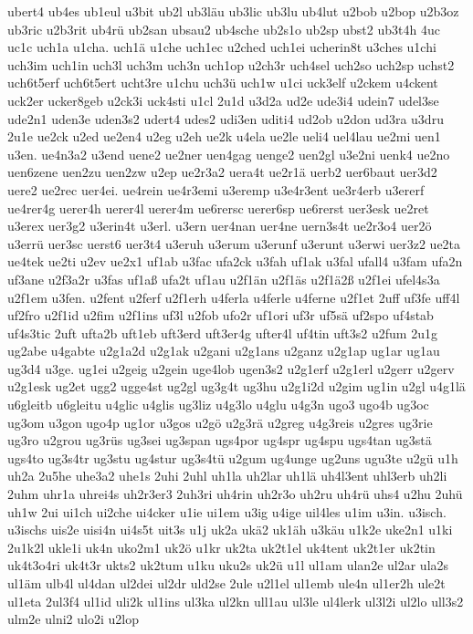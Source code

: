 {ubert4
ub4es
ub1eul
u3bit
ub2l
ub3läu
ub3lic
ub3lu
ub4lut
u2bob
u2bop
u2b3oz
ub3ric
u2b3rit
ub4rü
ub2san
ubsau2
ub4sche
ub2s1o
ub2sp
ubst2
ub3t4h
4uc
uc1c
uch1a
u1cha.
uch1ä
u1che
uch1ec
u2ched
uch1ei
ucherin8t
u3ches
u1chi
uch3im
uch1in
uch3l
uch3m
uch3n
uch1op
u2ch3r
uch4sel
uch2so
uch2sp
uchst2
uch6t5erf
uch6t5ert
ucht3re
u1chu
uch3ü
uch1w
u1ci
uck3elf
u2ckem
u4ckent
uck2er
ucker8geb
u2ck3i
uck4sti
u1cl
2u1d
u3d2a
ud2e
ude3i4
udein7
udel3se
ude2n1
uden3e
uden3s2
udert4
udes2
udi3en
uditi4
ud2ob
u2don
ud3ra
u3dru
2u1e
ue2ck
u2ed
ue2en4
u2eg
u2eh
ue2k
u4ela
ue2le
ueli4
uel4lau
ue2mi
uen1
u3en.
ue4n3a2
u3end
uene2
ue2ner
uen4gag
uenge2
uen2gl
u3e2ni
uenk4
ue2no
uen6zene
uen2zu
uen2zw
u2ep
ue2r3a2
uera4t
ue2r1ä
uerb2
uer6baut
uer3d2
uere2
ue2rec
uer4ei.
ue4rein
ue4r3emi
u3eremp
u3e4r3ent
ue3r4erb
u3ererf
ue4rer4g
uerer4h
uerer4l
uerer4m
ue6rersc
uerer6sp
ue6rerst
uer3esk
ue2ret
u3erex
uer3g2
u3erin4t
u3erl.
u3ern
uer4nan
uer4ne
uern3s4t
ue2r3o4
uer2ö
u3errü
uer3sc
uerst6
uer3t4
u3eruh
u3erum
u3erunf
u3erunt
u3erwi
uer3z2
ue2ta
ue4tek
ue2ti
u2ev
ue2x1
uf1ab
u3fac
ufa2ck
u3fah
uf1ak
u3fal
ufall4
u3fam
ufa2n
uf3ane
u2f3a2r
u3fas
uf1aß
ufa2t
uf1au
u2f1än
u2f1äs
u2f1ä2ß
u2f1ei
ufel4s3a
u2f1em
u3fen.
u2fent
u2ferf
u2f1erh
u4ferla
u4ferle
u4ferne
u2f1et
2uff
uf3fe
uff4l
uf2fro
u2f1id
u2fim
u2f1ins
uf3l
u2fob
ufo2r
uf1ori
uf3r
uf5sä
uf2spo
uf4stab
uf4s3tic
2uft
ufta2b
uft1eb
uft3erd
uft3er4g
ufter4l
uf4tin
uft3s2
u2fum
2u1g
ug2abe
u4gabte
u2g1a2d
u2g1ak
u2gani
u2g1ans
u2ganz
u2g1ap
ug1ar
ug1au
ug3d4
u3ge.
ug1ei
u2geig
u2gein
uge4lob
ugen3s2
u2g1erf
u2g1erl
u2gerr
u2gerv
u2g1esk
ug2et
ugg2
ugge4st
ug2gl
ug3g4t
ug3hu
u2g1i2d
u2gim
ug1in
u2gl
u4g1lä
u6gleitb
u6gleitu
u4glic
u4glis
ug3liz
u4g3lo
u4glu
u4g3n
ugo3
ugo4b
ug3oc
ug3om
u3gon
ugo4p
ug1or
u3gos
u2gö
u2g3rä
u2greg
u4g3reis
u2gres
ug3rie
ug3ro
u2grou
ug3rüs
ug3sei
ug3span
ugs4por
ug4spr
ug4spu
ugs4tan
ug3stä
ugs4to
ug3s4tr
ug3stu
ug4stur
ug3s4tü
u2gum
ug4unge
ug2uns
ugu3te
u2gü
u1h
uh2a
2u5he
uhe3a2
uhe1s
2uhi
2uhl
uh1la
uh2lar
uh1lä
uh4l3ent
uhl3erb
uh2li
2uhm
uhr1a
uhrei4s
uh2r3er3
2uh3ri
uh4rin
uh2r3o
uh2ru
uh4rü
uhs4
u2hu
2uhü
uh1w
2ui
ui1ch
ui2che
ui4cker
u1ie
ui1em
u3ig
u4ige
uil4les
u1im
u3in.
u3isch.
u3ischs
uis2e
uisi4n
ui4s5t
uit3s
u1j
uk2a
ukä2
uk1äh
u3käu
u1k2e
uke2n1
u1ki
2u1k2l
ukle1i
uk4n
uko2m1
uk2ö
u1kr
uk2ta
uk2t1el
uk4tent
uk2t1er
uk2tin
uk4t3o4ri
uk4t3r
ukts2
uk2tum
u1ku
uku2s
uk2ü
u1l
ul1am
ulan2e
ul2ar
ula2s
ul1äm
ulb4l
ul4dan
ul2dei
ul2dr
uld2se
2ule
u2l1el
ul1emb
ule4n
ul1er2h
ule2t
ul1eta
2ul3f4
ul1id
uli2k
ul1ins
ul3ka
ul2kn
ull1au
ul3le
ul4lerk
ul3l2i
ul2lo
ull3s2
ulm2e
ulni2
ulo2i
u2lop
}

